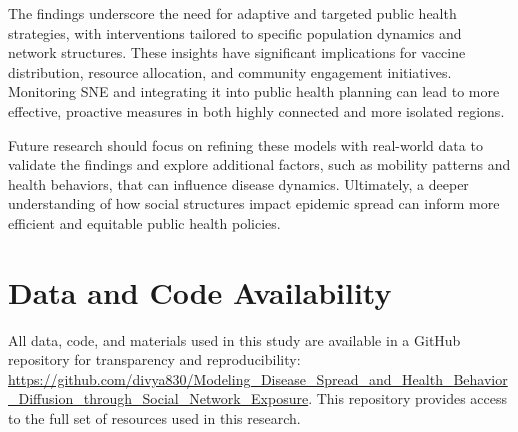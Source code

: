 \documentclass[9 pt]{article} %
\begin{document}
The findings underscore the need for adaptive and targeted public health strategies, with interventions tailored to specific population dynamics and network structures. These insights have significant implications for vaccine distribution, resource allocation, and community engagement initiatives. Monitoring SNE and integrating it into public health planning can lead to more effective, proactive measures in both highly connected and more isolated regions.

Future research should focus on refining these models with real-world data to validate the findings and explore additional factors, such as mobility patterns and health behaviors, that can influence disease dynamics. Ultimately, a deeper understanding of how social structures impact epidemic spread can inform more efficient and equitable public health policies.

\section{Data and Code Availability}
All data, code, and materials used in this study are available in a GitHub repository for transparency and reproducibility: \href{https://github.com/divya830/Modeling_Disease_Spread_and_Health_Behavior_Diffusion_through_Social_Network_Exposure}{https://github.com/divya830/Modeling\_Disease\_Spread\_and\_Health\_Behavior\_Diffusion\_through\_Social\_Network\_Exposure}. This repository provides access to the full set of resources used in this research.


\begin{small}


\end{small}
\end{document}
